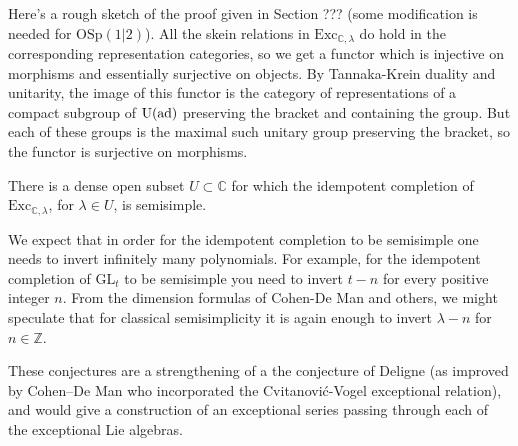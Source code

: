 \documentclass[12pt]{amsart}
\begin{document}
Here's a rough sketch of the proof given in Section ??? (some modification is needed for $\mathrm{OSp}(1|2)$).  All the skein relations in $\mathrm{Exc}_{\mathbb{C},\lambda}$ do hold in the corresponding representation categories, so we get a functor which is injective on morphisms and essentially surjective on objects.  By Tannaka-Krein duality and unitarity, the image of this functor is the category of representations of a compact subgroup of $\mathrm{U}(\operatorname{ad})$ preserving the bracket and containing the group.  But each of these groups is the maximal such unitary group preserving the bracket, so the functor is surjective on morphisms.  

\begin{conjecture}
There is a dense open subset $U \subset \mathbb{C}$ for which the idempotent completion of $\mathrm{Exc}_{\mathbb{C},\lambda}$, for $\lambda \in U$, is semisimple.
\end{conjecture}

We expect that in order for the idempotent completion to be semisimple one needs to invert infinitely many polynomials.  For example, for the idempotent completion of $\mathrm{GL}_t$ to be semisimple you need to invert $t-n$ for every positive integer $n$.  From the dimension formulas of Cohen-De Man and others, we might speculate that for classical semisimplicity it is again enough to invert $\lambda-n$ for $n \in \mathbb{Z}$.

These conjectures are a strengthening of a the conjecture of Deligne (as improved by Cohen--De Man who incorporated the Cvitanović-Vogel exceptional relation), and would give a construction of an exceptional series passing through each of the exceptional Lie algebras.
\end{document}
